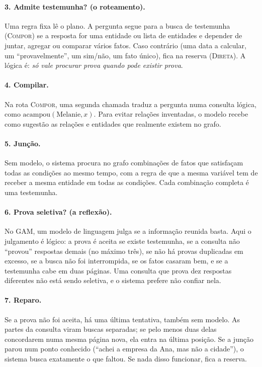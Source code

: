 \documentclass[11pt]{article}
\newcommand{\Compose}{\textsc{Compor}}
\newcommand{\Direct}{\textsc{Direta}}
\begin{document}
\paragraph{3. Admite testemunha? (o roteamento).}
Uma regra fixa lê o plano. A pergunta segue para a busca de testemunha
(\Compose{}) se a resposta for uma entidade ou lista de entidades e depender
de juntar, agregar ou comparar vários fatos. Caso contrário (uma data a
calcular, um ``provavelmente'', um sim/não, um fato único), fica na reserva
(\Direct{}). A lógica é: \emph{só vale procurar prova quando pode existir
prova}.

\paragraph{4. Compilar.}
Na rota \Compose{}, uma segunda chamada traduz a pergunta numa consulta
lógica, como $\mathrm{acampou}(\text{Melanie},x)$. Para evitar relações
inventadas, o modelo recebe como sugestão as relações e entidades que
realmente existem no grafo.

\paragraph{5. Junção.}
Sem modelo, o sistema procura no grafo combinações de fatos que satisfaçam
todas as condições ao mesmo tempo, com a regra de que a mesma variável tem de
receber a mesma entidade em todas as condições. Cada combinação completa é
uma testemunha.

\paragraph{6. Prova seletiva? (a reflexão).}
No GAM, um modelo de linguagem julga se a informação reunida basta. Aqui o
julgamento é lógico: a prova é aceita se existe testemunha, se a consulta não
``provou'' respostas demais (no máximo três), se não há provas duplicadas em
excesso, se a busca não foi interrompida, se os fatos casaram bem, e se a
testemunha cabe em duas páginas. Uma consulta que prova dez respostas
diferentes não está sendo seletiva, e o sistema prefere não confiar nela.

\paragraph{7. Reparo.}
Se a prova não foi aceita, há uma última tentativa, também sem modelo. As
partes da consulta viram buscas separadas; se pelo menos duas delas
concordarem numa mesma página nova, ela entra na última posição. Se a junção
parou num ponto conhecido (``achei a empresa da Ana, mas não a cidade''), o
sistema busca exatamente o que faltou. Se nada disso funcionar, fica a
reserva.
\end{document}
